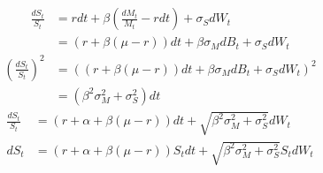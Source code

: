 \documentclass[12pt]{article}
\newenvironment{solution}[2][Solution]{\begin{trivlist}
\item[\hskip \labelsep {\bfseries #1}\hskip \labelsep {\bfseries #2.}]}{\end{trivlist}}
\newenvironment{question}[2][Question]{\begin{trivlist}
\item[\hskip \labelsep {\bfseries #1}\hskip \labelsep {\bfseries #2.}]}{\end{trivlist}}
\begin{document}
\ \\
\ \\
\begin{question}{2}
\end{question}
\begin{solution}[Solution] \\ 
\begin{align*}
    \frac{dS_t}{S_t} &= rdt+ \beta \left(\frac{dM_t}{M_t}-rdt\right) +\sigma_S dW_t \\
    &= (r+\beta(\mu - r))dt+ \beta \sigma_M dB_t +\sigma_S dW_t
\end{align*}
\begin{align*}
    \left(\frac{dS_t}{S_t}\right)^2 &= \left((r+\beta(\mu - r))dt+ \beta \sigma_M dB_t +\sigma_S dW_t\right)^2\\
    &= \left( \beta^2 \sigma_M^2 +\sigma_S^2\right) dt
\end{align*}
\begin{align*}
    \frac{dS_t}{S_t} &= (r+\alpha+\beta(\mu -r))dt+ \sqrt{\beta^2 \sigma_M^2 +\sigma_S^2} dW_t \\
    dS_t &= (r+\alpha+\beta(\mu -r))S_t dt+ \sqrt{\beta^2 \sigma_M^2 +\sigma_S^2} S_t dW_t
\end{align*}
\end{solution}
\end{document}
